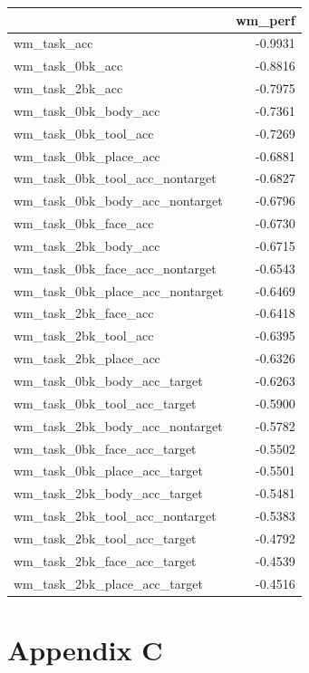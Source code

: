 \documentclass{article}
\begin{document}
\begin{table}[H]
\centering
\begin{tabular}{lr}
\toprule
 & wm\_perf \\
\midrule
wm\_task\_acc & -0.9931 \\
wm\_task\_0bk\_acc & -0.8816 \\
wm\_task\_2bk\_acc & -0.7975 \\
wm\_task\_0bk\_body\_acc & -0.7361 \\
wm\_task\_0bk\_tool\_acc & -0.7269 \\
wm\_task\_0bk\_place\_acc & -0.6881 \\
wm\_task\_0bk\_tool\_acc\_nontarget & -0.6827 \\
wm\_task\_0bk\_body\_acc\_nontarget & -0.6796 \\
wm\_task\_0bk\_face\_acc & -0.6730 \\
wm\_task\_2bk\_body\_acc & -0.6715 \\
wm\_task\_0bk\_face\_acc\_nontarget & -0.6543 \\
wm\_task\_0bk\_place\_acc\_nontarget & -0.6469 \\
wm\_task\_2bk\_face\_acc & -0.6418 \\
wm\_task\_2bk\_tool\_acc & -0.6395 \\
wm\_task\_2bk\_place\_acc & -0.6326 \\
wm\_task\_0bk\_body\_acc\_target & -0.6263 \\
wm\_task\_0bk\_tool\_acc\_target & -0.5900 \\
wm\_task\_2bk\_body\_acc\_nontarget & -0.5782 \\
wm\_task\_0bk\_face\_acc\_target & -0.5502 \\
wm\_task\_0bk\_place\_acc\_target & -0.5501 \\
wm\_task\_2bk\_body\_acc\_target & -0.5481 \\
wm\_task\_2bk\_tool\_acc\_nontarget & -0.5383 \\
wm\_task\_2bk\_tool\_acc\_target & -0.4792 \\
wm\_task\_2bk\_face\_acc\_target & -0.4539 \\
wm\_task\_2bk\_place\_acc\_target & -0.4516 \\
\bottomrule
\end{tabular}

\footnotesize
\normalsize
\end{table}


\section{Appendix C}\label{sec:appendix-c}
\end{document}
